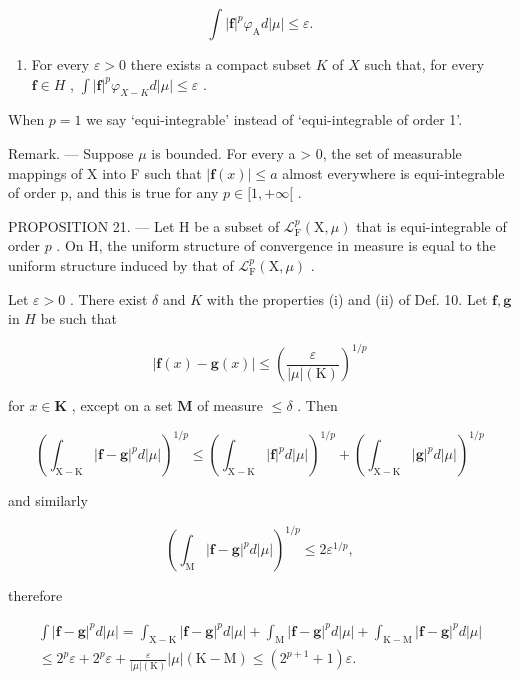 \[
\int | \mathbf {f} | ^ {p} \varphi_ {\mathrm{A}} d | \mu | \leqslant \varepsilon .
\]

\begin{enumerate}
\def\labelenumi{(\roman{enumi})}
\setcounter{enumi}{1}
\tightlist
\item
  For every \(\varepsilon > 0\) there exists a compact subset \(K\) of \(X\) such that, for every \(\mathbf{f} \in H\) , \(\int |\mathbf{f}|^p \varphi_{X - K} d|\mu| \leqslant \varepsilon\) .
\end{enumerate}

When \(p = 1\) we say `equi-integrable' instead of `equi-integrable of order 1'.

Remark. --- Suppose \(\mu\) is bounded. For every a \textgreater{} 0, the set of measurable mappings of X into F such that \(|\mathbf{f}(x)| \leqslant a\) almost everywhere is equi-integrable of order p, and this is true for any \(p \in [1, +\infty[\) .

PROPOSITION 21. --- Let H be a subset of \(\mathcal{L}_{\mathrm{F}}^{p}(\mathrm{X},\mu)\) that is equi-integrable of order \(p\) . On H, the uniform structure of convergence in measure is equal to the uniform structure induced by that of \(\mathcal{L}_{\mathrm{F}}^{p}(\mathrm{X},\mu)\) .

Let \(\varepsilon > 0\) . There exist \(\delta\) and \(K\) with the properties (i) and (ii) of Def. 10. Let \(\mathbf{f}, \mathbf{g}\) in \(H\) be such that

\[
| \mathbf {f} (x) - \mathbf {g} (x) | \leqslant \left(\frac {\varepsilon}{| \mu | (\mathrm{K})}\right) ^ {1 / p}
\]

for \(x \in \mathbf{K}\) , except on a set \(\mathbf{M}\) of measure \(\leqslant \delta\) . Then

\[
\left(\int_ {\mathrm{X} - \mathrm{K}} | \mathbf {f} - \mathbf {g} | ^ {p} d | \mu |\right) ^ {1 / p} \leqslant \left(\int_ {\mathrm{X} - \mathrm{K}} | \mathbf {f} | ^ {p} d | \mu |\right) ^ {1 / p} + \left(\int_ {\mathrm{X} - \mathrm{K}} | \mathbf {g} | ^ {p} d | \mu |\right) ^ {1 / p}
\]

and similarly

\[
\left(\int_ {\mathrm{M}} | \mathbf {f} - \mathbf {g} | ^ {p} d | \mu |\right) ^ {1 / p} \leqslant 2 \varepsilon^ {1 / p},
\]

therefore

\[
\begin{array}{c} \int | \mathbf {f} - \mathbf {g} | ^ {p} d | \mu | = \int_ {\mathrm{X-K}} | \mathbf {f} - \mathbf {g} | ^ {p} d | \mu | + \int_ {\mathrm{M}} | \mathbf {f} - \mathbf {g} | ^ {p} d | \mu | + \int_ {\mathrm{K-M}} | \mathbf {f} - \mathbf {g} | ^ {p} d | \mu | \\ \leqslant 2 ^ {p} \varepsilon + 2 ^ {p} \varepsilon + \frac {\varepsilon}{| \mu | (\mathrm{K})} | \mu | (\mathrm{K-M}) \leqslant (2 ^ {p + 1} + 1) \varepsilon . \end{array}
\]

